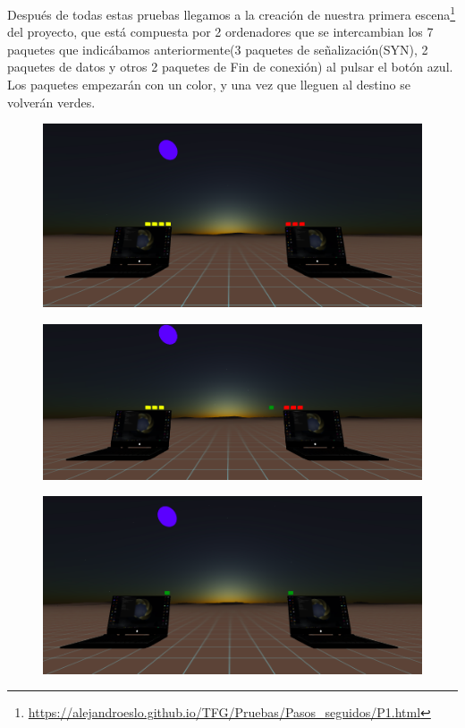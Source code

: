 \documentclass[a4paper, 12pt]{book}
\begin{document}
\newpage
Después de todas estas pruebas llegamos a la creación de nuestra primera escena\footnote{\url{https://alejandroeslo.github.io/TFG/Pruebas/Pasos_seguidos/P1.html}} del proyecto, que está compuesta por 2 ordenadores que se intercambian los 7 paquetes que indicábamos anteriormente(3 paquetes de señalización(SYN), 2 paquetes de datos y otros 2 paquetes de Fin de conexión) al pulsar el botón azul.
Los paquetes empezarán con un color, y una vez que lleguen al destino se volverán verdes.

\begin{figure}[h]
\centering
    \includegraphics[scale=0.33]{img/escenafinal_1.png}
\end{figure}

\begin{figure}[h]
\centering
    \includegraphics[scale=0.33]{img/escenafinal_2.png}
\end{figure}

\begin{figure}[h]
\centering
    \includegraphics[scale=0.35]{img/escenafinal_3.png}
\end{figure}
\end{document}
